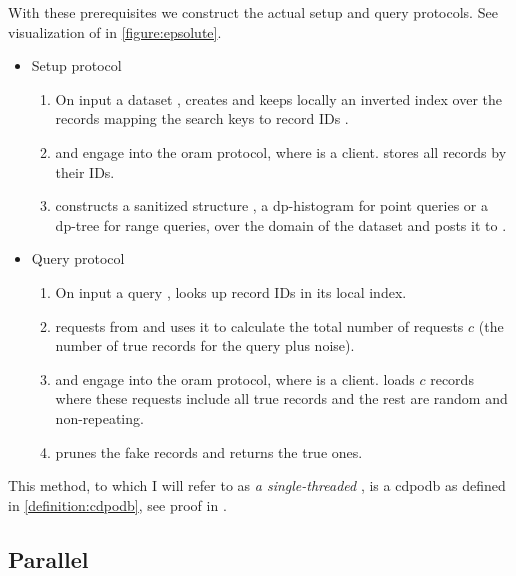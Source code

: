 			With these prerequisites we construct the actual setup and query protocols.
			See visualization of \protocolQuery{} in \cref{figure:epsolute}.
			\begin{itemize}
				\item
					Setup protocol \protocolSetup{}
					\begin{enumerate}
						\item
							On input a dataset \database{}, \user{} creates and keeps locally an inverted index over the records mapping the search keys \searchKey{} to record IDs \recordID{}.
						\item
							\user{} and \server{} engage into the \acrshort{oram} protocol, where \user{} is a client.
							\user{} stores all records by their IDs.
						\item
							\user{} constructs a sanitized structure \serverDS{}, a \acrshort{dp}-histogram for point queries or a \acrshort{dp}-tree for range queries, over the domain of the dataset and posts it to \server{}.
					\end{enumerate}
				\item
					Query protocol \protocolQuery{}
					\begin{enumerate}
						\item
							On input a query \query{}, \user{} looks up record IDs in its local index.
						\item
							\user{} requests \serverDS{} from \server{} and uses it to calculate the total number of requests $c$ (the number of true records for the query plus noise).
						\item
							\user{} and \server{} engage into the \acrshort{oram} protocol, where \user{} is a client.
							\user{} loads $c$ records where these requests include all true records and the rest are random and non-repeating.
						\item
							\user{} prunes the fake records and returns the true ones.
					\end{enumerate}
			\end{itemize}

			

			This method, to which I will refer to as \emph{a single-threaded \epsolute{}}, is a \acrlong{cdpodb} as defined in \cref{definition:cdpodb}, see proof in \cite[Section 4.2]{epsolute}.

		\subsection{Parallel \epsolute{}}\label{section:range-queries-persistent:parallel-epsolute}


